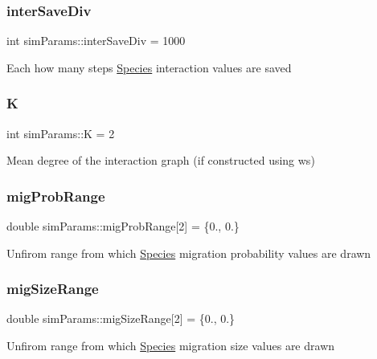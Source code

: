 \subsubsection{\texorpdfstring{inter\+Save\+Div}{interSaveDiv}}
{\footnotesize\ttfamily int sim\+Params\+::inter\+Save\+Div = 1000}

Each how many steps \hyperlink{classSpecies}{Species} interaction values are saved \mbox{\label{structsimParams_a31066db5156bfb80ea66ef46ee263d39}} 
\subsubsection{\texorpdfstring{K}{K}}
{\footnotesize\ttfamily int sim\+Params\+::K = 2}

Mean degree of the interaction graph (if constructed using ws) \mbox{\label{structsimParams_a4a67c773b31598604c56efc130a69945}} 
\subsubsection{\texorpdfstring{mig\+Prob\+Range}{migProbRange}}
{\footnotesize\ttfamily double sim\+Params\+::mig\+Prob\+Range\mbox{[}2\mbox{]} = \{0., 0.\}}

Unfirom range from which \hyperlink{classSpecies}{Species} migration probability values are drawn \mbox{\label{structsimParams_a2486796d56e9fbe5d9f2dbd507a6ce5d}} 
\subsubsection{\texorpdfstring{mig\+Size\+Range}{migSizeRange}}
{\footnotesize\ttfamily double sim\+Params\+::mig\+Size\+Range\mbox{[}2\mbox{]} = \{0., 0.\}}

Unfirom range from which \hyperlink{classSpecies}{Species} migration size values are drawn \mbox{\label{structsimParams_a2c0a57da585258a84362a2c297ee44cb}} 
